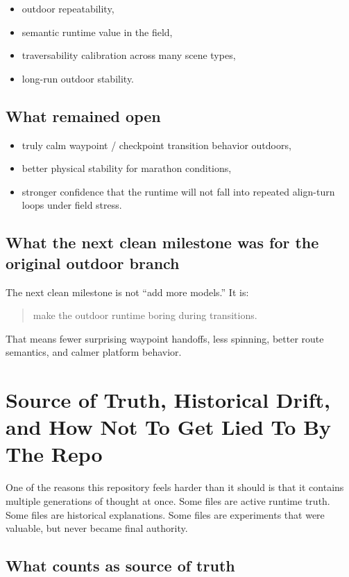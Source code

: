 \documentclass[11pt]{article}
\begin{document}
\begin{itemize}[nosep]
  \item outdoor repeatability,
  \item semantic runtime value in the field,
  \item traversability calibration across many scene types,
  \item long-run outdoor stability.
\end{itemize}

\subsection*{What remained open}

\begin{itemize}[nosep]
  \item truly calm waypoint / checkpoint transition behavior outdoors,
  \item better physical stability for marathon conditions,
  \item stronger confidence that the runtime will not fall into repeated align-turn
  loops under field stress.
\end{itemize}

\subsection*{What the next clean milestone was for the original outdoor branch}

The next clean milestone is not ``add more models.'' It is:

\begin{quote}
make the outdoor runtime boring during transitions.
\end{quote}

That means fewer surprising waypoint handoffs, less spinning, better route
semantics, and calmer platform behavior.

\section{Source of Truth, Historical Drift, and How Not To Get Lied To By The Repo}

One of the reasons this repository feels harder than it should is that it contains
multiple generations of thought at once. Some files are active runtime truth. Some
files are historical explanations. Some files are experiments that were valuable,
but never became final authority.

\subsection{What counts as source of truth}
\end{document}
